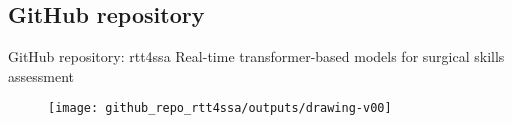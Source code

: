 \subsection{GitHub repository}

{
\begin{frame}{GitHub repository: rtt4ssa}
Real-time transformer-based models for surgical skills assessment

      \begin{figure}
        \centering
        \texttt{[image: github\_repo\_rtt4ssa/outputs/drawing-v00]}
      \end{figure}

\end{frame}
}

